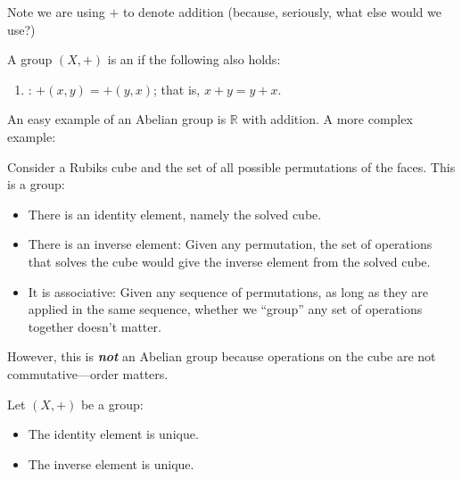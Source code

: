 \documentclass{article}
\begin{document}
Note we are using $+$ to denote addition (because, seriously, what else would we use?)
\begin{definition}
  A group $(X, +)$ is an  if the following also holds:
  \begin{enumerate}[start=4]
    \item {}: $+(x, y) = +(y, x)$; that is, $x + y = y + x$.
  \end{enumerate}
\end{definition}

An easy example of an Abelian group is $\mathbb{R}$ with addition. A more complex example:
\begin{example}
  Consider a Rubiks cube and the set of all possible permutations of the faces. This is a group:
  \begin{itemize}[label=$\bullet$]
    \item There is an identity element, namely the solved cube.

    \item There is an inverse element: Given any permutation, the set of operations that solves the cube would give the inverse element from the solved cube.

    \item It is associative: Given any sequence of permutations, as long as they are applied in the same sequence, whether we ``group'' any set of operations together doesn't matter.
  \end{itemize}

  However, this is \textbf{\textit{not}} an Abelian group because operations on the cube are not commutative---order matters.
\end{example}

\begin{claim}
  Let $(X, +)$ be a group:
  \begin{itemize}[label=$\bullet$]
    \item The identity element is unique.

    \item The inverse element is unique.
  \end{itemize}
\end{claim}
\end{document}
